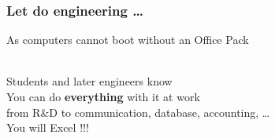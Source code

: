 \begin{frame}
  \frametitle{Let do engineering \ldots}
  \begin{center}
    As computers cannot boot without an Office Pack \\[1em]
     \\[.5em]
    Students and later engineers know \\[.5em]
    You can do \textbf{everything} with it at work \\[.5em]
    from R\&D to communication, database, accounting, \ldots \\[1em]
    You will Excel !!!
  \end{center}
\end{frame}

